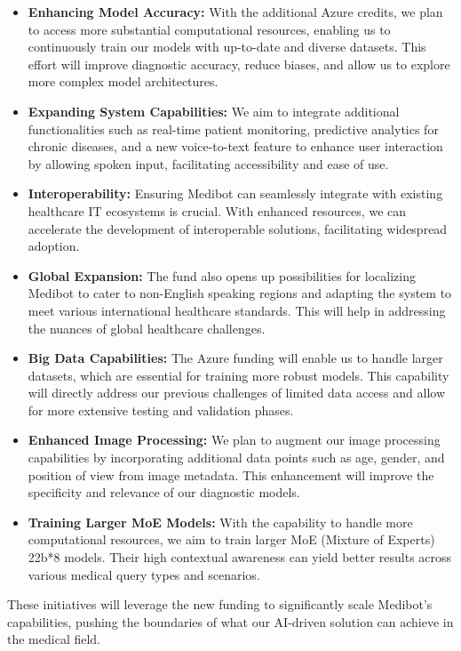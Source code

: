 \begin{itemize}
    \item \textbf{Enhancing Model Accuracy:} With the additional Azure credits, we plan to access more substantial computational resources, enabling us to continuously train our models with up-to-date and diverse datasets. This effort will improve diagnostic accuracy, reduce biases, and allow us to explore more complex model architectures.
    \item \textbf{Expanding System Capabilities:} We aim to integrate additional functionalities such as real-time patient monitoring, predictive analytics for chronic diseases, and a new voice-to-text feature to enhance user interaction by allowing spoken input, facilitating accessibility and ease of use.
    \item \textbf{Interoperability:} Ensuring Medibot can seamlessly integrate with existing healthcare IT ecosystems is crucial. With enhanced resources, we can accelerate the development of interoperable solutions, facilitating widespread adoption.
    \item \textbf{Global Expansion:} The fund also opens up possibilities for localizing Medibot to cater to non-English speaking regions and adapting the system to meet various international healthcare standards. This will help in addressing the nuances of global healthcare challenges.
    \item \textbf{Big Data Capabilities:} The Azure funding will enable us to handle larger datasets, which are essential for training more robust models. This capability will directly address our previous challenges of limited data access and allow for more extensive testing and validation phases.
    \item \textbf{Enhanced Image Processing:} We plan to augment our image processing capabilities by incorporating additional data points such as age, gender, and position of view from image metadata. This enhancement will improve the specificity and relevance of our diagnostic models.
    \item \textbf{Training Larger MoE Models:} With the capability to handle more computational resources, we aim to train larger MoE (Mixture of Experts) 22b*8 models. Their high contextual awareness can yield better results across various medical query types and scenarios.
\end{itemize}

These initiatives will leverage the new funding to significantly scale Medibot’s capabilities, pushing the boundaries of what our AI-driven solution can achieve in the medical field.


